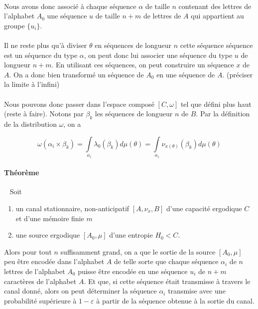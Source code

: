 \documentclass[a4paper,12pt]{article}
\begin{document}
	\paragraph{}
	Nous avons donc associé à chaque séquence $\alpha$ de taille $n$ contenant des lettres de l'alphabet $A_0$ une séquence $u$ de taille $n+m$ de
	lettres de $A$ qui appartient au groupe $\{u_i\}$. 
	
	\paragraph{}
	Il ne reste plus qu'à diviser $\theta$ en séquences de longueur $n$ cette séquence séquence est un séquence du type $\alpha$, on peut donc lui 
	associer une séquence du type $u$ de longueur $n+m$. En utilisant ces séquences, on peut construire un séquence $x$ de $A$. On a donc bien transformé
	un séquence de $A_0$ en une séquence de $A$. (préciser la limite à l'infini)
	
	\paragraph{}
	Nous pouvons donc passer dans l'espace composé $[C,\omega]$ tel que défini plus haut (reste à faire). Notons par $\beta_k$ les séquences de longueur $n$ de $B$.
	Par la définition de la distribution $\omega$, on a 
	
	\[\omega(\alpha_i\times\beta_k)=\int\limits_{\alpha_i}\lambda_0(\beta_k)d\mu(\theta)=\int\limits_{\alpha_i}\nu_{x(\theta)}(\beta_k)d\mu(\theta)\]
	
	\paragraph{Théorème}\ 
	\newline
	Soit 
	\begin{enumerate}
		\item un canal stationnaire, non-anticipatif $[A,\nu_x,B]$ d'une capacité ergodique $C$ et d'une mémoire finie $m$
		\item une source ergodique $[A_0,\mu]$ d'une entropie $H_0<C$.
	\end{enumerate}
	Alors pour tout $n$ suffisamment grand, on a que le sortie de la source $[A_0,\mu]$ peu être encodée dans l'alphabet $A$ de telle sorte que
	chaque séquence $\alpha_i$ de $n$ lettres de l'alphabet $A_0$ puisse être encodée en une séquence $u_i$ de $n+m$ caractères de l'alphabet $A$. 
	Et que, si cette séquence était transmisse à travers le canal donné, alors on peut déterminer la séquence $\alpha_i$ transmise avec une probabilité 
	supérieure à $1-\varepsilon$ à partir de la séquence obtenue à la sortie du canal.
\end{document}
